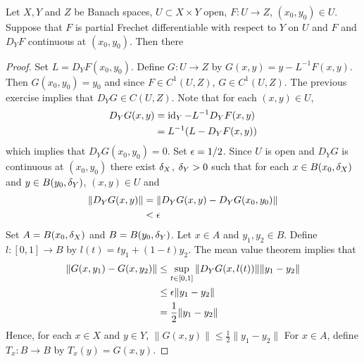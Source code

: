 \documentclass{book}
\begin{document}
	\begin{ex}
		Let $X, Y$ and $Z$ be Banach spaces, $U \subset X \times Y$ open, $F: U \rightarrow Z$, $(x_0, y_0) \in U$. Suppose that $F$ is partial Frechet differentiable with respect to $Y$ on $U$ and $F$ and $D_YF$ continuous at $(x_0, y_0)$. Then there  
	\end{ex}

	\begin{proof}
		Set $L = D_YF(x_0, y_0)$. Define $G: U \rightarrow Z$ by $G(x,y) = y - L^{-1}F(x,y)$. Then $G(x_0, y_0) = y_0$ and since $F \in C^1(U, Z)$, $G \in C^1(U, Z)$. The previous exercise implies that $D_YG \in C(U, Z)$. Note that for each $(x,y) \in U$,
		\begin{align*}
			D_YG(x, y) 
			& = \operatorname{id}_Y - L^{-1} D_YF(x,y) \\
			& = L^{-1}(L - D_YF(x,y))
		\end{align*} 
		which implies that $D_YG(x_0, y_0) = 0$. Set $\epsilon = 1/2$. Since $U$ is open and $D_YG$ is continuous at $(x_0, y_0)$ there exist $\delta_X$, $\delta_Y > 0$ such that for each $x \in B(x_0, \delta_X)$ and $y \in B(y_0, \delta_Y)$, $(x, y) \in U$ and  
		\begin{align*}
			\|D_YG(x, y)\| 
			& =  \|D_YG(x, y) - D_YG(x_0, y_0)\| \\
			& < \epsilon
		\end{align*}
		Set $A = B(x_0, \delta_X)$ and $B = B(y_0, \delta_Y)$. Let $x \in A$ and $y_1, y_2 \in B$. Define $l: [0,1] \rightarrow B$ by $l(t) = ty_1 + (1-t)y_2$. The mean value theorem implies that 
		\begin{align*}
			\|G(x, y_1) - G(x, y_2)\| 
			& \leq \sup_{t \in [0,1]} \|D_YG(x, l(t))\|\|y_1 - y_2\| \\
			& \leq \epsilon \|y_1 - y_2\| \\
			& = \frac{1}{2}\|y_1 - y_2\| 
		\end{align*} 
		Hence, for each $x \in X$ and $y \in Y$, 
		$\|G(x, y)\| \leq \frac{1}{2}\|y_1 - y_2\|$  
		For $x \in A$, define $T_x: B \rightarrow B$ by $T_x(y) = G(x,y)$. 
	\end{proof}


	
	
	
	
	
	
	
	
	
	
	
	
	
	
	
	
	
	
\end{document}
